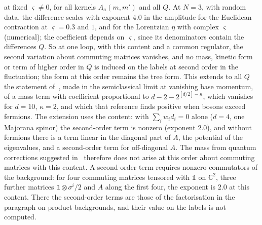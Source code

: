 at fixed \(\varsigma\neq0\), for all kernels \(A_a(m,m')\) and all \(Q\). At \(N=3\), with random data, the difference scales with exponent \(4.0\) in the amplitude for the Euclidean contraction at \(\varsigma=0.3\) and \(1\), and for the Lorentzian \(\eta\) with complex \(\varsigma\) (numerical); the coefficient depends on \(\varsigma\), since its denominators contain the differences \(Q\). So at one loop, with this content and a common regulator, the second variation about commuting matrices vanishes, and no mass, kinetic form or term of higher order in \(Q\) is induced on the labels at second order in the fluctuation; the form at this order remains the tree form. This extends to all \(Q\) the statement of~\cite{Sakai2017}, made in the semiclassical limit at vanishing base momentum, of a mass term with coefficient proportional to \(d-2-2^{[d/2]-\kappa}\), which vanishes for \(d=10\), \(\kappa=2\), and which that reference finds positive when bosons exceed fermions. The extension uses the content: with \(\sum_iw_id_i=0\) alone (\(d=4\), one Majorana spinor) the second-order term is nonzero (exponent \(2.0\)), and without fermions there is a term linear in the diagonal part of \(A\), the potential of the eigenvalues, and a second-order term for off-diagonal \(A\). The mass from quantum corrections suggested in~\cite{FurutaHanadaKawaiKimura2007} therefore does not arise at this order about commuting matrices with this content. A second-order term requires nonzero commutators of the background: for four commuting matrices tensored with \(\mathbb 1\) on \(\mathbb C^2\), three further matrices \(\mathbb 1\otimes\sigma^i/2\) and \(A\) along the first four, the exponent is \(2.0\) at this content. There the second-order terms are those of the factorisation in the paragraph on product backgrounds, and their value on the labels is not computed.

